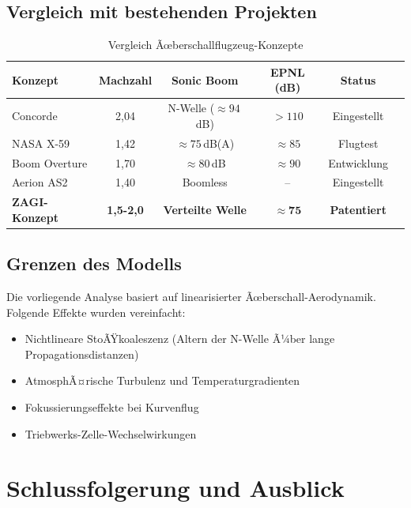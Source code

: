 ﻿\documentclass[12pt,a4paper]{article}
\theoremstyle{definition}
\theoremstyle{remark}
\begin{document}
\subsection{Vergleich mit bestehenden Projekten}

\begin{table}[H]
  \centering
  \caption{Vergleich Ãœberschallflugzeug-Konzepte}
  \label{tab:vergleich}
  \begin{tabular}{lccccl}
    \toprule
    Konzept & Machzahl & Sonic Boom & EPNL (dB) & Status \\
    \midrule
    Concorde & 2,04 & N-Welle ($\approx\!94\,$dB) & $>110$ & Eingestellt \\
    NASA X-59 & 1,42 & $\approx\!75\,$dB(A) & $\approx\!85$ & Flugtest \\
    Boom Overture & 1,70 & $\approx\!80\,$dB & $\approx\!90$ & Entwicklung \\
    Aerion AS2 & 1,40 & Boomless & -- & Eingestellt \\
    \textbf{ZAGI-Konzept} & \textbf{1,5-2,0} & \textbf{Verteilte Welle} & $\mathbf{\approx 75}$ & \textbf{Patentiert} \\
    \bottomrule
  \end{tabular}
\end{table}

\subsection{Grenzen des Modells}

Die vorliegende Analyse basiert auf linearisierter Ãœberschall-Aerodynamik. Folgende
Effekte wurden vereinfacht:
\begin{itemize}
  \item Nichtlineare StoÃŸkoaleszenz (Altern der N-Welle Ã¼ber lange Propagationsdistanzen)
  \item AtmosphÃ¤rische Turbulenz und Temperaturgradienten
  \item Fokussierungseffekte bei Kurvenflug
  \item Triebwerks-Zelle-Wechselwirkungen
\end{itemize}

\section{Schlussfolgerung und Ausblick}
\label{sec:schluss}
\end{document}
